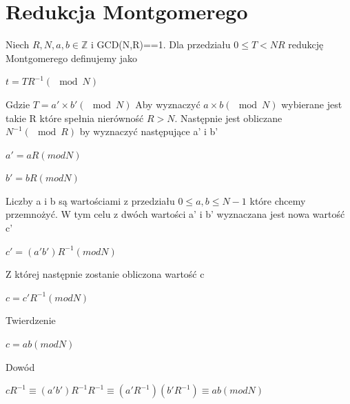\documentclass{article}
\begin{document}
\newpage
\section{Redukcja Montgomerego}\label{Redukcja Montgomerego}
Niech \begin{math}R,N,a,b \in \mathbb{Z}\end{math} i GCD(N,R)==1. Dla przedziału  \begin{math}0 \leq T< NR \end{math} redukcję Montgomerego definujemy jako 
\begin{center}
    \begin{math}
        t=TR^{-1}(\mod N)
    \end{math}
\end{center}
Gdzie \begin{math}
    T= a'\times b' (\mod N)
\end{math}
\newline
Aby wyznaczyć \begin{math} a \times b (\mod N) \end{math}
wybierane jest takie R które spełnia nierówność \begin{math}R>N\end{math}. Następnie jest obliczane \begin{math}N^{-1}(\mod R)\end{math} by wyznaczyć następujące a' i b'
\begin{center}
    \begin{math}
        a' = aR(mod N)
    \end{math}
\end{center}
\begin{center}
    \begin{math}
        b' = bR(mod N)
    \end{math}
\end{center}
Liczby a i b są wartościami z przedziału \begin{math}0\leq a,b \leq N-1\end{math} które chcemy przemnożyć. W tym celu z dwóch wartości a' i b' wyznaczana jest nowa wartość c'
\begin{center}
    \begin{math}
        c' = (a'b')R^{-1}(mod N)
    \end{math}
\end{center}
Z której następnie zostanie obliczona wartość c
\begin{center}
    \begin{math}
        c = c'R^{-1}(mod N)
    \end{math}
\end{center}
Twierdzenie
\begin{center}
    \begin{math}
        c =ab(mod N)
    \end{math}
\end{center}
Dowód
\begin{center}
    \begin{math}
        cR^{-1} \equiv (a'b')R^{-1}R^{-1} \equiv (a'R^{-1} )(b'R^{-1} ) \equiv  ab(mod N)
    \end{math}
\end{center}
\end{document}
